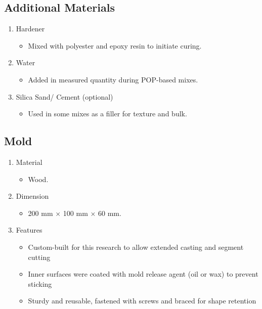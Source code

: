 \subsection{Additional Materials}
\begin{enumerate}
	\item Hardener
	      \begin{itemize}
		      \item Mixed with polyester and epoxy resin to initiate curing.
	      \end{itemize}
	\item Water
	      \begin{itemize}
		      \item Added in measured quantity during POP-based mixes.
	      \end{itemize}
	\item  Silica Sand/ Cement (optional)
	      \begin{itemize}
		      \item Used in some mixes as a filler for texture and bulk.
	      \end{itemize}
\end{enumerate}

\subsection{Mold}
\begin{enumerate}
	\item Material
	      \begin{itemize}
		      \item Wood.
	      \end{itemize}
	\item Dimension
	      \begin{itemize}
		      \item 200 mm $\times$ 100 mm $\times$ 60 mm.
	      \end{itemize}
	\item  Features
	      \begin{itemize}
		      \item Custom-built for this research to allow extended casting and segment cutting
		      \item Inner surfaces were coated with mold release agent (oil or wax) to prevent sticking
		      \item Sturdy and reusable, fastened with screws and braced for shape retention
	      \end{itemize}
\end{enumerate}

